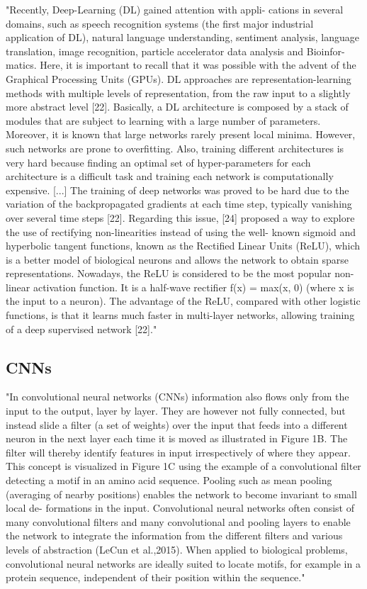 \documentclass[]{scrartcl}
\begin{document}
"Recently, Deep-Learning (DL) gained attention with appli-
cations in several domains, such as speech recognition systems (the first major industrial application of DL), natural language understanding, sentiment analysis, language translation, image recognition, particle accelerator data analysis and Bioinfor- matics. Here, it is important to recall that it was possible with the advent of the Graphical Processing Units (GPUs). DL approaches are representation-learning methods with multiple levels of representation, from the raw input to a slightly more abstract level [22]. Basically, a DL architecture is composed by a stack of modules that are subject to learning with a large number of parameters. Moreover, it is known that large networks rarely present local minima. However, such networks are prone to overfitting. Also, training different architectures is very hard because finding an optimal set of hyper-parameters for each architecture is a difficult task and training each network is computationally expensive. [...] The training of deep networks was proved to be hard due to the variation of the backpropagated gradients at each time step, typically vanishing over several time steps [22]. Regarding this issue, [24] proposed a way to explore the use of rectifying non-linearities instead of using the well- known sigmoid and hyperbolic tangent functions, known as the Rectified Linear Units (ReLU), which is a better model of biological neurons and allows the network to obtain sparse representations. Nowadays, the ReLU is considered to be the most popular non-linear activation function. It is a half-wave rectifier f(x) = max(x, 0) (where x is the input to a neuron). The advantage of the ReLU, compared with other logistic functions, is that it learns much faster in multi-layer networks, allowing training of a deep supervised network [22]." \cite{Hattori2017}

\subsection{CNNs}
"In convolutional neural networks (CNNs) information also flows only from the input to the output, layer by layer. They are however not fully connected, but instead slide a filter (a set of weights) over the input that feeds into a different neuron in the next layer each time it is moved as illustrated in Figure 1B. The filter will thereby identify features in input irrespectively of where they appear. This concept is visualized in Figure 1C using the example of a convolutional filter detecting a motif in an amino acid sequence. Pooling such as mean pooling (averaging of nearby positions) enables the network to become invariant to small local de- formations in the input. Convolutional neural networks often consist of many convolutional filters and many convolutional and pooling layers to enable the network to integrate the information from the different filters and various levels of abstraction (LeCun et al.,2015). When applied to biological problems, convolutional neural networks are ideally suited to locate motifs, for example in a protein sequence, independent of their position within the sequence." \cite{Jurtz2017}
\end{document}
